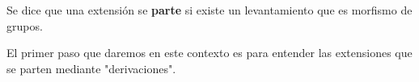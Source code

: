 %

\begin{definition}
	Se dice que una extensión se \textbf{parte} si existe un levantamiento que
	es morfismo de grupos.
\end{definition}

El primer paso que daremos en este contexto es para entender las extensiones que se parten 
mediante "derivaciones". 

%
%	

